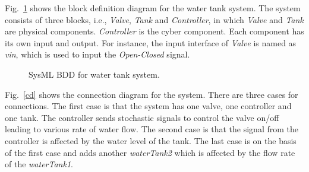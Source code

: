 Fig.~\ref{myad} shows the block definition diagram for the water tank system. The system consists of three blocks, i.e., \emph{Valve}, \emph{Tank} and \emph{Controller}, in which \emph{Valve} and \emph{Tank} are physical components. \emph{Controller} is the cyber component. Each component has its own input and output. For instance, the input interface of \emph{Valve} is named as \emph{vin}, which is used to input the \emph{Open-Closed} signal. 
\begin{figure}[htbp]
	\caption{SysML BDD for water tank system.}
	\label{myad}
\end{figure}

Fig.~\ref{cd} shows the connection diagram for the system. There are three cases for connections. The first case is that the system has one valve, one controller and one tank. The controller sends stochastic signals to control the valve on/off leading to various rate of water flow. The second case is that the signal from the controller is affected by the water level of the tank. The last case is on the basis of the first case and adds another \emph{waterTank2} which is affected by the flow rate of the \emph{waterTank1}.

